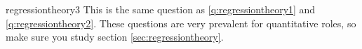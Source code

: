 \begin{answer}{regressiontheory3}
This is the same question as \ref{q:regressiontheory1} and \ref{q:regressiontheory2}.
These questions are very prevalent for quantitative roles, so make sure you study section \ref{sec:regressiontheory}.
\end{answer}
